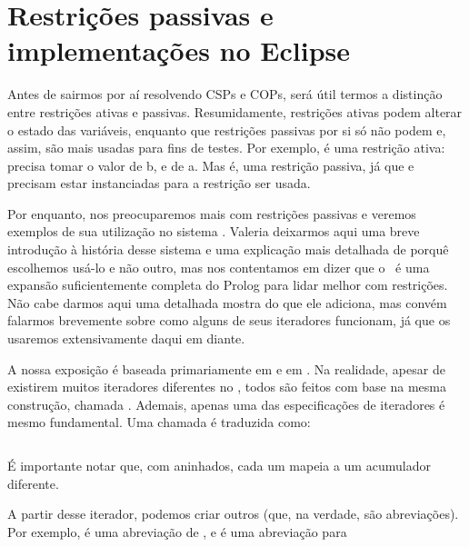 
%

%
%

%

\section{Restrições passivas e implementações no Eclipse}

Antes de sairmos por aí resolvendo CSPs e COPs, será útil termos a distinção entre restrições ativas
e passivas. Resumidamente, restrições ativas podem alterar o estado das variáveis, enquanto que
restrições passivas por si só não podem e, assim, são mais usadas para fins de testes. Por exemplo,
 é uma restrição ativa:  precisa tomar o valor de b, e  de a. Mas
 é, uma restrição passiva, já que  e  precisam estar instanciadas
para a restrição ser usada.

Por enquanto, nos preocuparemos mais com restrições passivas e veremos exemplos de sua utilização no
sistema \eclipse. Valeria deixarmos aqui uma breve introdução à história desse sistema e uma
explicação mais detalhada de porquê escolhemos usá-lo e não outro, mas nos contentamos em dizer que
o \eclipse\ é uma expansão suficientemente completa do Prolog para lidar melhor com restrições. Não
cabe darmos aqui uma detalhada mostra do que ele adiciona, mas convém falarmos brevemente
sobre como alguns de seus iteradores funcionam, já que os usaremos extensivamente daqui em diante.

A nossa exposição é baseada primariamente em \cite{joachim} e em \cite{schimpf}. Na realidade,
apesar de existirem muitos iteradores diferentes no \eclipse, todos são feitos com base na mesma
construção, chamada . Ademais, apenas uma das especificações de iteradores é mesmo
fundamental. Uma chamada  é traduzida como:

\inputminted{prolog}{../Exemplos/Cap8/prog8_fromto.pl}

\noindent É importante notar que, com  aninhados, cada um mapeia a um acumulador
diferente.

A partir desse iterador, podemos criar outros (que, na verdade, são abreviações). Por exemplo,
 é uma abreviação de , e  é uma abreviação para 


